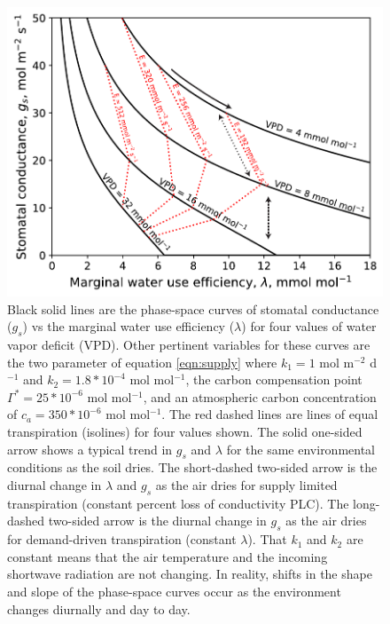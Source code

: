 \documentclass[utf8]{frontiersSCNS} %
\begin{document}
\begin{figure}[h]
    \begin{center}
         \includegraphics[scale=0.75]{gs_lam.pdf}   
    \end{center}
    \caption{Black solid lines are the phase-space curves of stomatal conductance ($g_s$) vs the marginal water use efficiency ($\lambda$) for four values of water vapor deficit (VPD). Other pertinent variables for these curves are the two parameter of equation \ref{eqn:supply} where $k_1 = 1$ mol m$^{-2}$ d$^{-1}$ and $k_2 = 1.8 * 10^{-4}$ mol mol$^{-1}$, the carbon compensation point $\Gamma^* = 25*10^{-6}$ mol mol$^{-1}$, and an atmospheric carbon concentration of $c_a = 350*10^{-6}$ mol mol$^{-1}$. The red dashed lines are lines of equal transpiration (isolines) for four values shown. The solid one-sided arrow shows a typical trend in $g_s$ and $\lambda$ for the same environmental conditions as the soil dries. The short-dashed two-sided arrow is the diurnal change in $\lambda$ and $g_s$ as the air dries for supply limited transpiration (constant percent loss of conductivity PLC). The long-dashed two-sided arrow is the diurnal change in $g_s$ as the air dries for demand-driven transpiration (constant $\lambda$). That $k_1$ and $k_2$ are constant means that the air temperature and the incoming shortwave radiation are not changing. In reality, shifts in the shape and slope of the phase-space curves occur as the environment changes diurnally and day to day.}
    \label{fig:gs_lam}
\end{figure}
\end{document}

